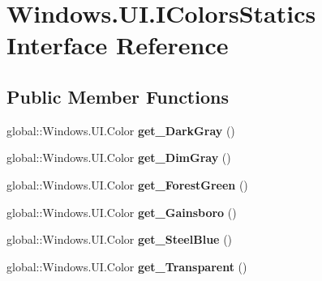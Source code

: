 \hypertarget{interface_windows_1_1_u_i_1_1_i_colors_statics}{}\section{Windows.\+U\+I.\+I\+Colors\+Statics Interface Reference}
\label{interface_windows_1_1_u_i_1_1_i_colors_statics}
\subsection*{Public Member Functions}
\begin{DoxyCompactItemize}
\item 
\mbox{\label{interface_windows_1_1_u_i_1_1_i_colors_statics_a7881fc8328a2a78e233e768a2e6f0880}} 
global\+::\+Windows.\+U\+I.\+Color {\bfseries get\+\_\+\+Dark\+Gray} ()
\item 
\mbox{\label{interface_windows_1_1_u_i_1_1_i_colors_statics_a57a216be793e9b6baabf198a690082d5}} 
global\+::\+Windows.\+U\+I.\+Color {\bfseries get\+\_\+\+Dim\+Gray} ()
\item 
\mbox{\label{interface_windows_1_1_u_i_1_1_i_colors_statics_a3f27cb7bcd43c9c99b01b805fca5e8b7}} 
global\+::\+Windows.\+U\+I.\+Color {\bfseries get\+\_\+\+Forest\+Green} ()
\item 
\mbox{\label{interface_windows_1_1_u_i_1_1_i_colors_statics_a411827a3820423543c46de55db7fb69d}} 
global\+::\+Windows.\+U\+I.\+Color {\bfseries get\+\_\+\+Gainsboro} ()
\item 
\mbox{\label{interface_windows_1_1_u_i_1_1_i_colors_statics_a210c8445bedd3241983fb1bc4cfe050a}} 
global\+::\+Windows.\+U\+I.\+Color {\bfseries get\+\_\+\+Steel\+Blue} ()
\item 
\mbox{\label{interface_windows_1_1_u_i_1_1_i_colors_statics_a8d6675f108b15f0d9a646bdc0c88d0fd}} 
global\+::\+Windows.\+U\+I.\+Color {\bfseries get\+\_\+\+Transparent} ()
\item 
\mbox{\label{interface_windows_1_1_u_i_1_1_i_colors_statics_af103ebd073e0458fbb00b0f60145c1e5}} 

\end{DoxyCompactItemize}
